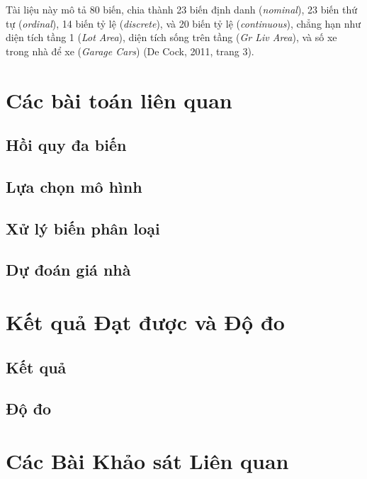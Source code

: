 \documentclass{article}
\begin{document}
Tài liệu này mô tả 80 biến, chia thành 23 biến định danh (\textit{nominal}), 23 biến thứ tự (\textit{ordinal}), 14 biến tỷ lệ (\textit{discrete}), và 20 biến tỷ lệ (\textit{continuous}), chẳng hạn như diện tích tầng 1 (\textit{Lot Area}), diện tích sống trên tầng (\textit{Gr Liv Area}), và số xe trong nhà để xe (\textit{Garage Cars}) (De Cock, 2011, trang 3).

\section{Các bài toán liên quan}

\subsection{Hồi quy đa biến}

\subsection{Lựa chọn mô hình}

\subsection{Xử lý biến phân loại}

\subsection{Dự đoán giá nhà}


\section{Kết quả Đạt được và Độ đo}
\subsection{Kết quả}

\subsection{Độ đo}


\section{Các Bài Khảo sát Liên quan}

\end{document}
